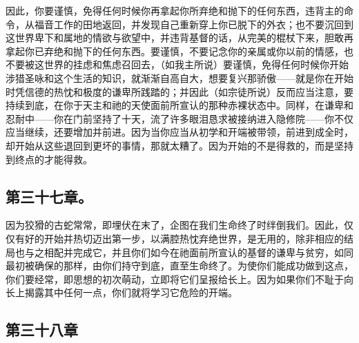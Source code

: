 \par

因此，你要谨慎，免得任何时候你再拿起你所弃绝和抛下的任何东西，违背主的命令，从福音工作的田地返回，并发现自己重新穿上你已脱下的外衣；也不要沉回到这世界卑下和属地的情欲与欲望中，并违背基督的话，从完美的棍杖下来，胆敢再拿起你已弃绝和抛下的任何东西。要谨慎，不要记念你的亲属或你以前的情感，也不要被这世界的挂虑和焦虑召回去，（如我主所说）要谨慎，免得任何时候你开始涉猎圣咏和这个生活的知识，就渐渐自高自大，想要复兴那骄傲——就是你在开始时凭信德的热忱和极度的谦卑所践踏的；并因此（如宗徒所说）反而应当注意，要持续到底，在你于天主和祂的天使面前所宣认的那种赤裸状态中。同样，在谦卑和忍耐中——你在门前坚持了十天，流了许多眼泪恳求被接纳进入隐修院——你不仅应当继续，还要增加并前进。因为当你应当从初学和开端被带领，前进到成全时，却开始从这些退回到更坏的事情，那就太糟了。因为开始的不是得救的，而是坚持到终点的才能得救。\par


\subsection{第三十七章。}

\par

因为狡猾的古蛇常常，即埋伏在末了，企图在我们生命终了时绊倒我们。因此，仅仅有好的开始并热切迈出第一步，以满腔热忱弃绝世界，是无用的，除非相应的结局也与之相配并完成它，并且你们如今在祂面前所宣认的基督的谦卑与贫穷，如同最初被确保的那样，由你们持守到底，直至生命终了。为使你们能成功做到这点，你们要经常，即思想的初次萌动，立即将它们呈报给长上。因为如果你们不耻于向长上揭露其中任何一点，你们就将学习它危险的开端。\par


\subsection{第三十八章}

\par


